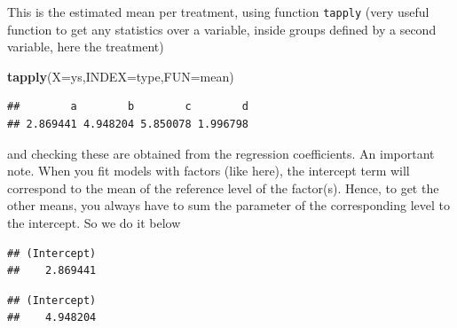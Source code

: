 \documentclass[
]{book}
\newenvironment{Shaded}{\begin{snugshade}}{\end{snugshade}}
\newcommand{\CommentTok}[1]{\textcolor[rgb]{0.56,0.35,0.01}{\textit{#1}}}
\newcommand{\DataTypeTok}[1]{\textcolor[rgb]{0.13,0.29,0.53}{#1}}
\newcommand{\DecValTok}[1]{\textcolor[rgb]{0.00,0.00,0.81}{#1}}
\newcommand{\KeywordTok}[1]{\textcolor[rgb]{0.13,0.29,0.53}{\textbf{#1}}}
\newcommand{\NormalTok}[1]{#1}
\newcommand{\OperatorTok}[1]{\textcolor[rgb]{0.81,0.36,0.00}{\textbf{#1}}}
\begin{document}
This is the estimated mean per treatment, using function \texttt{tapply} (very useful function to get any statistics over a variable, inside groups defined by a second variable, here the treatment)

\begin{Shaded}
\begin{Highlighting}[]
\KeywordTok{tapply}\NormalTok{(}\DataTypeTok{X=}\NormalTok{ys,}\DataTypeTok{INDEX=}\NormalTok{type,}\DataTypeTok{FUN=}\NormalTok{mean)}
\end{Highlighting}
\end{Shaded}

\begin{verbatim}
##        a        b        c        d 
## 2.869441 4.948204 5.850078 1.996798
\end{verbatim}

and checking these are obtained from the regression coefficients.
An important note. When you fit models with factors (like here), the intercept term will correspond to the mean of the reference level of the factor(s). Hence, to get the other means, you always have to sum the parameter of the corresponding level to the intercept. So we do it below

\begin{Shaded}
\end{Shaded}

\begin{verbatim}
## (Intercept) 
##    2.869441
\end{verbatim}

\begin{Shaded}
\end{Shaded}

\begin{verbatim}
## (Intercept) 
##    4.948204
\end{verbatim}

\begin{Shaded}
\end{Shaded}
\end{document}
